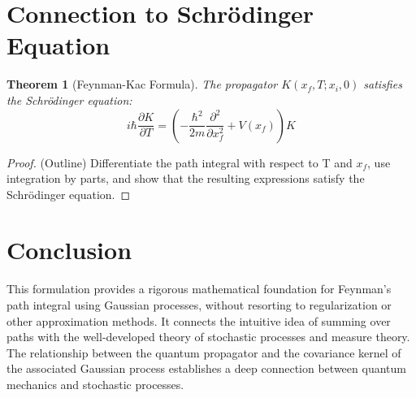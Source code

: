 \documentclass{article}
\newtheorem{theorem}{Theorem}
\begin{document}
\section{Connection to Schrödinger Equation}

\begin{theorem}[Feynman-Kac Formula]
The propagator $K(x_f, T; x_i, 0)$ satisfies the Schrödinger equation:
\begin{equation}
    i\hbar \frac{\partial K}{\partial T} = \left(-\frac{\hbar^2}{2m} \frac{\partial^2}{\partial x_f^2} + V(x_f)\right)K
\end{equation}
\end{theorem}

\begin{proof}
(Outline) Differentiate the path integral with respect to T and $x_f$, use integration by parts, and show that the resulting expressions satisfy the Schrödinger equation.
\end{proof}

\section{Conclusion}

This formulation provides a rigorous mathematical foundation for Feynman's path integral using Gaussian processes, without resorting to regularization or other approximation methods. It connects the intuitive idea of summing over paths with the well-developed theory of stochastic processes and measure theory. The relationship between the quantum propagator and the covariance kernel of the associated Gaussian process establishes a deep connection between quantum mechanics and stochastic processes.
\end{document}
